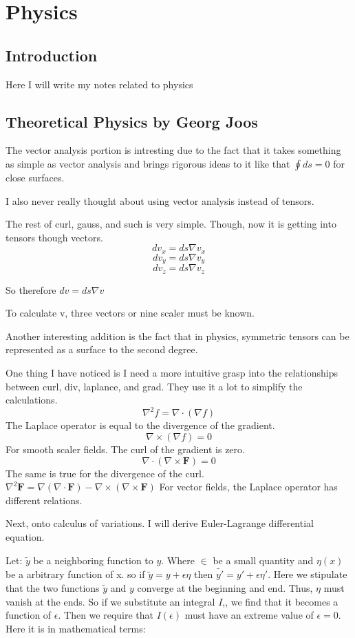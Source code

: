 
\chapter{Physics}
\section{Introduction}
Here I will write my notes related to physics
\section{Theoretical Physics by Georg Joos}
\par The vector analysis portion is intresting due to the fact that it takes something as simple as vector analysis and brings rigorous ideas to it like that $\oint ds=0 $ for close surfaces. 
\par I also never really thought about using vector analysis instead of tensors. 
\par The rest of curl, gauss, and such is very simple. Though, now it is getting into tensors though vectors.
$$dv_x=ds\nabla v_x$$
$$dv_y=ds\nabla v_y$$
$$dv_z=ds\nabla v_z$$
\par So therefore $dv=ds \nabla v$
\par To calculate v, three vectors or nine scaler must be known.
\par Another interesting addition is the fact that in physics, symmetric tensors can be represented as a surface to the second degree.
\par One thing I have noticed is I need a more intuitive grasp into the relationships between curl, div, laplance, and grad. They use it a lot to simplify the calculations. 
$$\nabla^2 f = \nabla \cdot (\nabla f)$$
The Laplace operator is equal to the divergence of the gradient.
$$\nabla \times (\nabla f) = 0$$
For smooth scaler fields. The curl of the gradient is zero.
$$\nabla \cdot (\nabla \times \mathbf{F}) = 0$$
The same is true for the divergence of the curl.
$\nabla^2 \mathbf{F} = \nabla(\nabla \cdot \mathbf{F}) - \nabla \times (\nabla \times \mathbf{F})$
For vector fields, the Laplace operator has different relations.
\\
\par Next, onto calculus of variations. I will derive Euler-Lagrange differential equation.
\par Let: $\tilde{y}$ be a neighboring function to $y$. Where $\in$ be a small quantity and $\eta(x)$ be a arbitrary function of x. so if $\tilde{y}=y+\epsilon \eta$ then $\tilde{y'}=y'+ \epsilon \eta'$. Here we stipulate that the two functions $\tilde{y}$ and $y$ converge at the beginning and end. Thus, $\eta$ must vanish at the ends. So if we substitute an integral $I$,, we find that it becomes a function of $\epsilon$. Then we require that $I(\epsilon)$ must have an extreme value of $\epsilon=0$. Here it is in mathematical terms:
